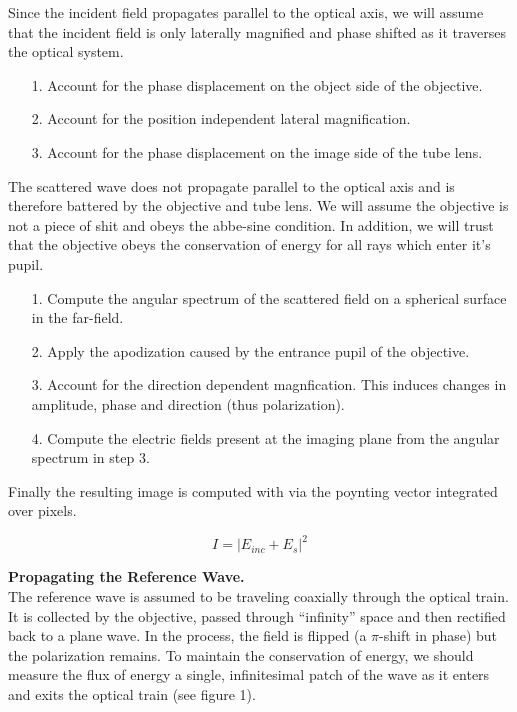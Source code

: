 Since the incident field propagates parallel to the optical axis, we will assume that
the incident field is only laterally magnified and phase shifted as it traverses the
optical system.
\begin{enumerate}
\item[1.] Account for the phase displacement on the object side of the objective.
\item[2.] Account for the position independent lateral magnification.
\item[3.] Account for the phase displacement on the image side of the tube lens.
\end{enumerate}
The scattered wave does not propagate parallel to the optical axis and is therefore
battered by the objective and tube lens. We will assume the objective is not a
piece of shit and obeys the abbe-sine condition. In addition, we will trust that the
objective obeys the conservation of energy for all rays which enter it's pupil.
\begin{enumerate}
\item[1.] Compute the angular spectrum of the scattered field on a spherical surface
  in the far-field.
\item[2.] Apply the apodization caused by the entrance pupil of the objective.
\item[3.] Account for the direction dependent magnfication. This induces changes in
  amplitude, phase and direction (thus polarization).
\item[4.] Compute the electric fields present at the imaging plane from the angular spectrum in step 3.
\end{enumerate}

Finally the resulting image is computed with via the poynting vector integrated over pixels.

\begin{equation*}
  I = \left | E_{inc} + E_{s} \right |^2 
\end{equation*}


  {\bf Propagating the Reference Wave.}\\ 
  The reference wave is assumed to be traveling coaxially through the optical
  train. It is collected by the objective, passed through ``infinity'' space
  and then rectified back to a plane wave. In the process, the field is flipped 
  (a $\pi$-shift in phase) but the polarization remains. 
  To maintain the conservation of energy, we should measure the flux of energy 
  a single, infinitesimal patch of the wave as it enters and exits the optical 
  train (see figure 1).

